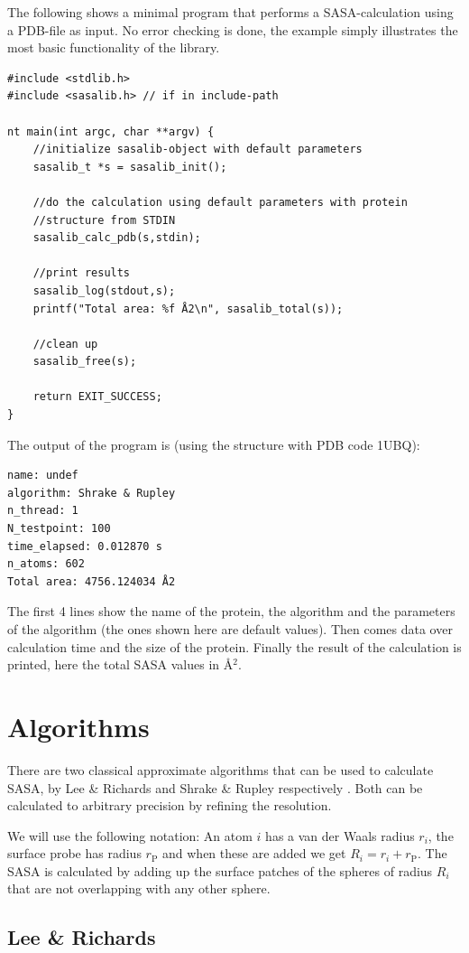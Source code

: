 \documentclass[a4paper,11pt]{article}
\begin{document}
The following shows a minimal program that performs a SASA-calculation
using a PDB-file as input. No error checking is done, the example
simply illustrates the most basic functionality of the library.
\begin{verbatim}
#include <stdlib.h>
#include <sasalib.h> // if in include-path

nt main(int argc, char **argv) { 
    //initialize sasalib-object with default parameters
    sasalib_t *s = sasalib_init();

    //do the calculation using default parameters with protein
    //structure from STDIN
    sasalib_calc_pdb(s,stdin);

    //print results
    sasalib_log(stdout,s);
    printf("Total area: %f Å2\n", sasalib_total(s));

    //clean up
    sasalib_free(s);

    return EXIT_SUCCESS;
}
\end{verbatim}
The output of the program is (using the structure with PDB code 1UBQ):
\begin{verbatim}
name: undef
algorithm: Shrake & Rupley
n_thread: 1
N_testpoint: 100
time_elapsed: 0.012870 s
n_atoms: 602
Total area: 4756.124034 Å2
\end{verbatim}
The first 4 lines show the name of the protein, the algorithm and the
parameters of the algorithm (the ones shown here are default
values). Then comes data over calculation time and the size of the
protein. Finally the result of the calculation is printed, here the
total SASA values in Å$^2$.

\section{Algorithms}

There are two classical approximate algorithms that can be used to
calculate SASA, by Lee \& Richards \cite{LnR} and Shrake \& Rupley
respectively \cite{SnR}. Both can be calculated to arbitrary precision
by refining the resolution.

We will use the following notation: An atom $i$ has a van der Waals
radius $r_i$, the surface probe has radius $r_\text{P}$ and when these
are added we get $R_i = r_i + r_\text{P}$. The SASA is calculated by
adding up the surface patches of the spheres of radius $R_i$ that are
not overlapping with any other sphere.

\subsection{Lee \& Richards} \label{sec:alg_LnR}
\end{document}
